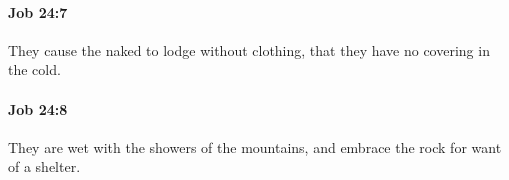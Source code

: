 		\paragraph{Job 24:7} %
			\label{JOB-24-7}

			They cause the naked to lodge without clothing, that they have no covering in the cold.


		\paragraph{Job 24:8} %
			\label{JOB-24-8}

			They are wet with the showers of the mountains, and embrace the rock for want of a shelter.



